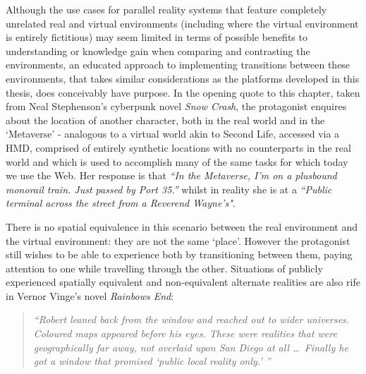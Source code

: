 Although the use cases for parallel reality systems that feature completely unrelated real and virtual environments (including where the virtual environment is entirely fictitious) may seem limited in terms of possible benefits to understanding or knowledge gain when comparing and contrasting the environments, an educated approach to implementing transitions between these environments, that takes similar considerations as the platforms developed in this thesis, does conceivably have purpose. In the opening quote to this chapter, taken from Neal Stephenson's cyberpunk novel \textit{Snow Crash}, the protagonist enquires about the location of another character, both in the real world and in the `Metaverse' - analogous to a virtual world akin to Second Life, accessed via a HMD, comprised of entirely synthetic locations with no counterparts in the real world and which is used to accomplish many of the same tasks for which today we use the Web. Her response is that \textit{``In  the Metaverse, I'm on a plusbound monorail train. Just passed by Port 35.''} whilst in reality she is at a \textit{``Public terminal across the street from a Reverend Wayne's"}.

There is no spatial equivalence in this scenario between the real environment and the virtual environment: they are not the same `place'. However the protagonist still wishes to be able to experience both by transitioning between them, paying attention to one while travelling through the other. Situations of publicly experienced spatially equivalent and non-equivalent alternate realities are also rife in Vernor Vinge's novel \textit{Rainbows End}:

\begin{quote}
	\textit{``Robert leaned back from the window and reached out to wider universes. Coloured maps appeared before his eyes. These were realities that were geographically far away, not overlaid upon San Diego at all \ldots\ Finally he got a window that promised `public local reality only.' ''}~\cite{Vinge2006}
\end{quote}

